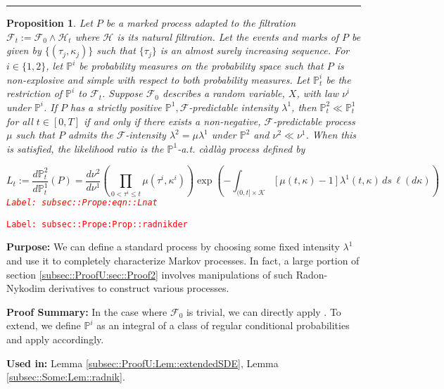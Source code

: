 \documentclass[12pt]{article}
\newcommand{\mb}{\mathbb}
\newcommand{\mc}{\mathcal}
\newcommand{\tr}{\textcolor{red}}
\newcommand{\labe}[1]{\tr{\texttt{Label: #1}}}
\newcommand{\purpose}{\textbf{Purpose: }}
\newcommand{\pfsum}{\textbf{Proof Summary: }}
\newcommand{\usein}{\textbf{Used in: }}
\newcommand{\lin}{\rule{\linewidth}{0.4 pt}}
\newcommand{\pr}{\mb{P}}							%
\renewcommand{\t}{t}							%
\newcommand{\F}{\mc{F}}							%
\newcommand{\FH}{\mc{H}}						%
\newcommand{\X}{X}								%
\newcommand{\ts}[1]{_{#1}}						%
\newcommand{\rate}{\lambda}						%
\newcommand{\indx}[1]{_{#1}}					%
\newcommand{\m}{\mu}							%
\newcommand{\mm}{\nu}							%
\newcommand{\me}[1]{^{#1}}						%
\newcommand{\rt}{\tau}							%
\renewcommand{\mark}{\kappa}					%
\newcommand{\rp}{P}								%
\newcommand{\mspce}{\mc{K}}						%
\newtheorem{prop}[thms]{Proposition}
\begin{document}
\lin

\begin{prop}
Let \(\rp\) be a marked process adapted to the filtration \(\F\ts{\t} := \F\ts{0}\wedge \FH\ts{\t}\) where \(\FH\) is its natural filtration. Let the events and marks of \(\rp\) be given by \(\{(\rt\indx{j},\mark\indx{j})\}\) such that \(\{\rt\indx{j}\}\) is an almost surely increasing sequence. For \(i \in \{1,2\}\), let \(\pr\me{i}\) be probability measures on the probability space such that \(\rp\) is non-explosive and simple with respect to both probability measures. Let \(\pr\me{i}\ts{\t}\) be the restriction of \(\pr\me{i}\) to \(\F\ts{\t}\). Suppose \(\F\ts{0}\) describes a random variable, \(\X\), with law \(\mm^i\) under \(\pr\me{i}\). If \(\rp\) has a strictly positive \(\pr\me{1},\F\)-predictable intensity \(\rate^1\), then \(\pr\me{2}\ts{\t} \ll \pr\me{1}\ts{\t}\) for all \(\t \in [0,T]\) if and only if there exists a non-negative, \(\F\)-predictable process \(\m\) such that \(\rp\) admits the \(\F\)-intensity \(\rate^2 = \m\rate^1\) under \(\pr\me{2}\) and \(\mm^2 \ll \mm^1\). When this is satisfied, the likelihood ratio is the \(\pr\me{1}\)-a.t. c\`adl\`ag process defined by 

\begin{equation}
L_\t:= \frac{d\pr\me{2}\ts{\t}}{d\pr\me{1}\ts{\t}}(\rp) = \frac{d\mm^2}{d\mm^1}\left(\prod_{0<\rt^i\leq \t} \m(\rt^i,\mark^i)\right)\exp\left(-\int_{(0,\t]\times \mspce}[\m(\t,\mark) - 1]\rate^1(\t,\mark)\,ds\,\ell(d\mark)\right)
\label{subsec::Prope:eqn::Lnat}
\end{equation}
\labe{subsec::Prope:eqn::Lnat}
\label{subsec::Prope:Prop::radnikder}
\end{prop}
\labe{subsec::Prope:Prop::radnikder}

\purpose We can define a standard process by choosing some fixed intensity \(\rate^1\) and use it to completely characterize Markov processes. In fact, a large portion of section \ref{subsec::ProofU:sec::Proof2} involves manipulations of such Radon-Nykodim derivatives to construct various processes.

\pfsum In the case where \(\F\ts{0}\) is trivial, we can directly apply \cite[Theorem 14.4.I]{DalVer08}. To extend, we define \(\pr\me{i}\) as an integral of a class of regular conditional probabilities and apply \cite[Theorem 14.4.I]{DalVer08} accordingly.

\usein Lemma \ref{subsec::ProofU:Lem::extendedSDE}, Lemma \ref{subsec::Some:Lem::radnik}.
\end{document}

